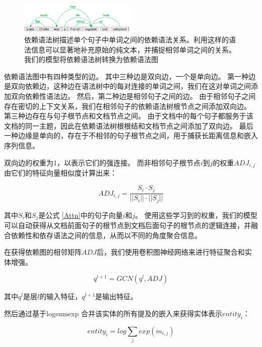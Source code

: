 \documentclass[bachelor]{thesis-uestc}
\begin{document}
\begin{figure}[t]
    \includegraphics[width=0.5\textwidth]{misc/dependency.png}
    \caption{依赖语法树描述单个句子中单词之间的依赖语法关系。利用这样的语法信息可以显著地补充原始的纯文本，并捕捉相邻单词之间的关系。我们的模型将依赖语法树转换为依赖语法图} 
    \label{fig_syn_a}
\end{figure}

依赖语法图中有四种类型的边。
其中三种边是双向边，一个是单向边。
第一种边是双向依赖边，这种边在语法树中的每对连接的单词之间，我们在这对单词之间添加双向依赖性语法边。
然后，第二种边是相邻句子之间的边。
由于相邻句子之间存在密切的上下文关系，我们在相邻句子的依赖语法树根节点之间添加双向边。
第三种边存在与句子根节点和文档节点之间。
由于文档中的每个句子都服务于该文档的同一主题，因此在依赖语法树根根结和文档节点之间添加了双向边。
最后一种边缘是单向的，存在于不相邻的句子根节点之间，用于捕获长距离信息和嵌入序列信息。\par
双向边的权重为1，以表示它们的强连接。
而非相邻句子根节点$i$到$j$的权重$ADJ_{i, j}$由它们的特征向量相似度计算出来：

\begin{equation}
    \label{edge weight}
    ADJ_{i,j} = \frac{S_i \cdot S_j}{||S_i|| \cdot ||S_j||}
\end{equation}

其中$S_i$和$S_j$是公式 \ref{Attn}中的句子向量$i$和$j$。
使用这些学习到的权重，我们的模型可以自动获得从文档前面句子的根节点到文档后面句子的根节点的逻辑连接，并融合依赖性和依存语法之间的信息，从而以不同的角度聚合信息。
\par

在获得依赖图的相邻矩阵$ADJ$后，我们使用卷积图神经网络来进行特征聚合和实体增强。

\begin{equation}
    q^{l+1} = GCN(q^{l}, ADJ)
\end{equation}

其中$q^l$是层$l$的输入特征，$q^{l+1}$是输出特征。\par
然后通过基于logsumexp \cite{jia-etal-2019-document}合并该实体的所有提及的嵌入来获得实体表示$entity_i$：

\begin{equation}
    \label{logsumexp}
    entity_i =  log \sum_{j} exp(m_{i,j})
\end{equation}
\end{document}
